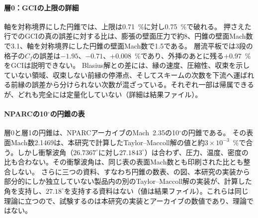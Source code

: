 \documentclass[twocolumn]{labreport}
\begin{document}
\paragraph{層0：GCIの上限の詳細}
軸を対称境界にした円錐では、上限は0.71~\%に対し0.75~\%で破れる。
押さえた行でのGCIの真の誤差に対する比は、膨張の壁面圧力で約8、円錐の壁面Mach数で3.1、軸を対称境界にした円錐の壁面Mach数で1.5である。
層流平板では3段の格子の$C_f$の誤差は$-1.95$、$-0.71$、$+0.008$~\%であり、外挿のあとに残る$+0.97$~\%をGCIは説明できない。
Blasius解との差には、縁の速度、圧縮性、収束を示していない領域、収束しない前縁の停滞点、そしてスキームの次数を下流へ運ばれる前縁の誤差から分けられない次数が混ざっている。それぞれ一部は帰属できるが、どれも完全には定量化していない（詳細は結果ファイル）。

\paragraph{NPARCの10$^\circ$の円錐の表}
\label{sec:cone10}
層0と層1の円錐は、NPARCアーカイブのMach~2.35の10$^\circ$の円錐\citep{nparc_cone10}である。
その表面Mach数2.1469は、本研究で計算したTaylor--Maccoll解の値と約$3\times10^{-3}$~\%で合う。しかし衝撃波角（$26.7367^\circ$に対し$27.1843^\circ$）は合わず、圧力、温度、密度の比も合わない。その衝撃波角は、同じ表の表面Mach数とも印刷された比とも整合しない。
さらに三つの資料、すなわち円錐の数表\citep{sims1964}、\citet{ames1953}の図、本研究の実装から部分的にしか独立していない製品内の別のTaylor--Maccoll解の実装が、計算した角を支持し、$27.18^\circ$を支持する資料はない（値は結果ファイル）。これらは同じ理論に立つので、試験するのは本研究の実装とアーカイブの数値であり、理論ではない。
\end{document}
